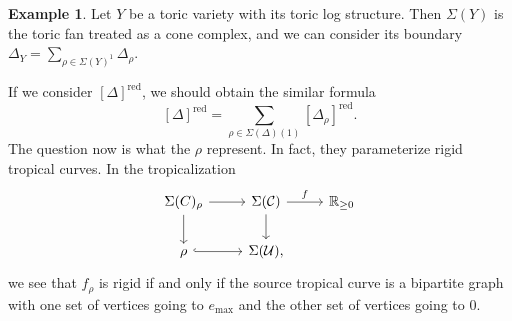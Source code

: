 \documentclass{amsart}
\theoremstyle{definition}
\newtheorem{exm}[thm]{Example}
\theoremstyle{remark}
\theoremstyle{plain}
\theoremstyle{definition}
\theoremstyle{remark}
\newcommand{\R}{\mathbb{R}}
\newcommand{\mc}[1]{\mathcal{#1}}
\newcommand{\on}[1]{\operatorname{#1}}
\newcommand{\1}{\mathbf{1}}
\newcommand{\2}{\mathbf{2}}
\newcommand{\3}{\mathbf{3}}
\begin{document}
\begin{exm}
    Let \(Y\) be a toric variety with its toric log structure. Then \(\Sigma(Y)\) is the toric fan treated as a cone complex, and we can consider its boundary \(\Delta_Y = \sum_{\rho \in \Sigma(Y)^1} \Delta_{\rho}\). 
\end{exm}

If we consider \([\Delta]^{\on{red}}\), we should obtain the similar formula
\[ [\Delta]^{\on{red}} = \sum_{\rho \in \Sigma(\Delta)(1)} [\Delta_{\rho}]^{\on{red}}. \]
The question now is what the \(\rho\) represent. In fact, they parameterize rigid tropical curves. In the tropicalization
\begin{equation*}
\begin{tikzcd}
    \Sigma(C)_{\rho} \ar{d} \ar{r} & \Sigma(\mc{C}) \ar{r}{f} \ar{d} & \R_{\geq 0} \\
    \rho \ar[hookrightarrow]{r} & \Sigma(\mc{U}),
\end{tikzcd}
\end{equation*}
we see that \(f_{\rho}\) is rigid if and only if the source tropical curve is a bipartite graph with one set of vertices going to \(e_{\max}\) and the other set of vertices going to \(0\).
\end{document}
